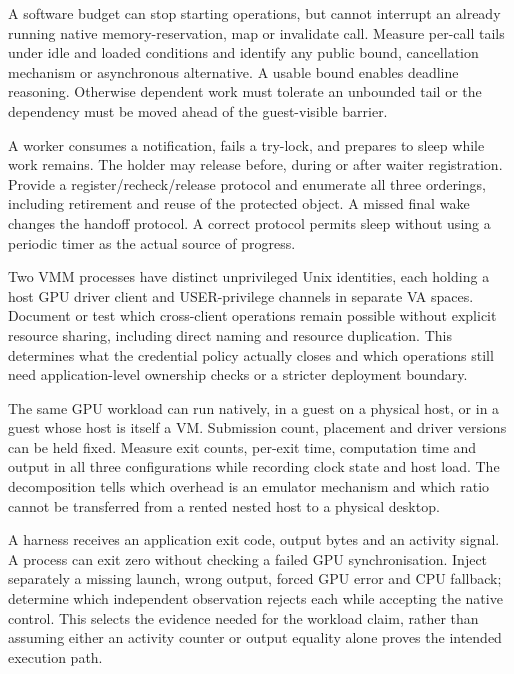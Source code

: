 {A software budget can stop starting operations, but cannot interrupt an already running native
memory-reservation, map or invalidate call.}
{Measure per-call tails under idle and loaded conditions and identify any public bound,
cancellation mechanism or asynchronous alternative.}
{A usable bound enables deadline reasoning. Otherwise dependent work must tolerate an unbounded
tail or the dependency must be moved ahead of the guest-visible barrier.}
\label{q:nativecall}

{A worker consumes a notification, fails a try-lock, and prepares to sleep while work remains. The
holder may release before, during or after waiter registration.}
{Provide a register/recheck/release protocol and enumerate all three orderings, including
retirement and reuse of the protected object.}
{A missed final wake changes the handoff protocol. A correct protocol permits sleep without using
a periodic timer as the actual source of progress.}
\label{q:wake}

{Two VMM processes have distinct unprivileged Unix identities, each holding a host GPU driver
client and USER-privilege channels in separate VA spaces.}
{Document or test which cross-client operations remain possible without explicit resource sharing,
including direct naming and resource duplication.}
{This determines what the credential policy actually closes and which operations still need
application-level ownership checks or a stricter deployment boundary.}
\label{q:uid}

{The same GPU workload can run natively, in a guest on a physical host, or in a guest whose host
is itself a VM. Submission count, placement and driver versions can be held fixed.}
{Measure exit counts, per-exit time, computation time and output in all three configurations while
recording clock state and host load.}
{The decomposition tells which overhead is an emulator mechanism and which ratio cannot be
transferred from a rented nested host to a physical desktop.}
\label{q:nested}

{A harness receives an application exit code, output bytes and an activity signal. A process can
exit zero without checking a failed GPU synchronisation.}
{Inject separately a missing launch, wrong output, forced GPU error and CPU fallback; determine
which independent observation rejects each while accepting the native control.}
{This selects the evidence needed for the workload claim, rather than assuming either an activity
counter or output equality alone proves the intended execution path.}
\label{q:proof}

